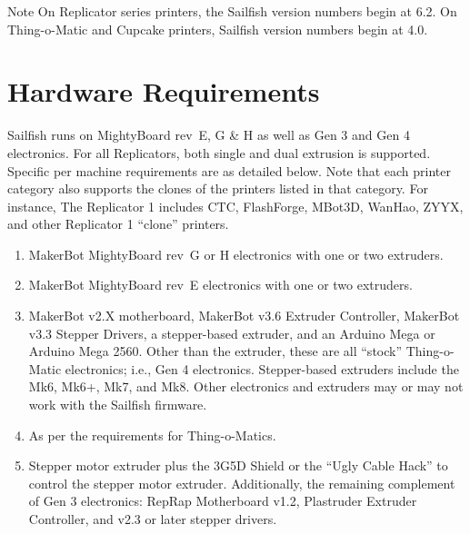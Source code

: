 \begin{bclogo}[logo=\bcinfo, noborder=true, couleurBarre=yellow]{Note}
On Replicator series printers, the Sailfish version numbers begin at 6.2.
On Thing-o-Matic and Cupcake printers, Sailfish version numbers begin at 4.0.
\end{bclogo}


\section{Hardware Requirements}

Sailfish runs on \gls{MightyBoard} rev~E, G \& H as well as \gls{Gen 3} and
\gls{Gen 4} electronics.
For all Replicators, both single and dual extrusion is supported.  Specific per
machine requirements are as detailed below.  Note that each printer category
also supports the clones of the printers listed in that category.  For instance, The
Replicator 1 includes CTC, FlashForge, MBot3D, WanHao, ZYYX, and
other Replicator 1 ``clone'' printers.

\begin{enumerate}
\item {} MakerBot MightyBoard rev~G or H
electronics with one or two extruders.
\item {} MakerBot MightyBoard rev~E electronics with
  one or two extruders.
\item {} MakerBot v2.X motherboard, MakerBot v3.6
Extruder Controller, MakerBot v3.3 Stepper Drivers, a stepper-based extruder,
and an Arduino Mega or Arduino Mega 2560. Other than the extruder, these are
all ``stock'' Thing-o-Matic electronics; i.e., Gen 4 electronics. Stepper-based
extruders include the Mk6, Mk6+, Mk7, and Mk8.  Other electronics and extruders
may or may not work with the Sailfish firmware.
\item {} As per the requirements for
  Thing-o-Matics.
\item {} Stepper motor extruder plus
 the 3G5D Shield or the ``Ugly Cable Hack'' to control the stepper motor
 extruder.  Additionally, the remaining complement of Gen 3 electronics: RepRap
 Motherboard v1.2, Plastruder Extruder Controller, and v2.3 or later stepper
 drivers.
\end{enumerate}

